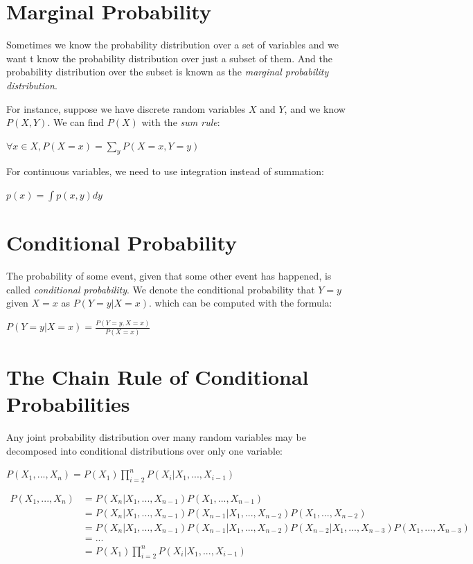 \documentclass{report}
\begin{document}
\section{Marginal Probability}
Sometimes we know the probability distribution over a set of variables and we want t know the probability distribution over just a subset of them. And the probability distribution over the subset is known as the \textit{marginal probability distribution}.\newline

For instance, suppose we have discrete random variables $X$ and $Y$, and we know $P(X,Y)$.\newline
We can find $P(X)$ with the \textit{sum rule}:\newline
    \centerline{$\forall x \in X, P(X=x) = \sum_y P(X=x,Y=y)$}\newline

For continuous variables, we need to use integration instead of summation:\newline
    \centerline{$p(x) = \int p(x,y)dy$}\newline

\section{Conditional Probability}
The probability of some event, given that some other event has happened, is called
\textit{conditional probability}. We denote the conditional probability that $Y=y$ given $X=x$ as $P(Y=y | X=x)$. which can be computed with the formula:\newline
    \centerline{$P(Y=y | X =x ) = \frac{P(Y=y,X=x)}{P(X=x)}$}\newline

\section{The Chain Rule of Conditional Probabilities}
Any joint probability distribution over many random variables may be decomposed into conditional distributions over only one variable:\newline
    \centerline{$P(X_1,...,X_n) = P(X_1)\prod_{i=2}^{n} P(X_i|X_1,...,X_{i-1})$}\newline

$\begin{aligned}
    P(X_1,...,X_n) &= P(X_n | X_1, ..., X_{n-1}) P(X_1, ..., X_{n-1}) \\
    &= P(X_n | X_1, ..., X_{n-1}) P(X_{n-1} | X_1, ..., X_{n-2}) P(X_1, ..., X_{n-2}) \\
    &= P(X_n | X_1, ..., X_{n-1}) P(X_{n-1} | X_1, ..., X_{n-2}) P(X_{n-2} | X_1, ..., X_{n-3}) P(X_1, ..., X_{n-3}) \\
    &= ... \\
    &= P(X_1)\prod_{i=2}^{n} P(X_i|X_1,...,X_{i-1})
\end{aligned}$
\end{document}
